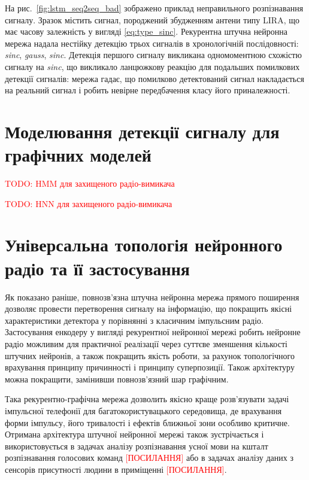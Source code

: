 На рис.~\ref{fig:lstm_seq2seq_bad} зображено приклад неправильного
розпізнавання сигналу. Зразок містить сигнал, породжений збудженням антени 
типу LIRA, що має часову залежність у вигляді \eqref{eq:type_sinc}. 
Рекурентна штучна нейронна мережа надала нестійку
детекцію трьох сигналів в хронологічній послідовності: \textit{sinc}, 
\textit{gauss}, \textit{sinc}. Детекція першого сигналу викликана 
одномоментною схожістю сигналу на \textit{sinc}, що викликало ланцюжкову 
реакцію для подальших помилкових детекції сигналів: мережа гадає, що 
помилково детектований сигнал накладається на реальний сигнал і робить 
невірне передбачення класу його приналежності.

\section{Моделювання детекції сигналу для графічних моделей}

\textcolor{red}{TODO: HMM для захищеного радіо-вимикача}

\textcolor{red}{TODO: HNN для захищеного радіо-вимикача}

\section{Універсальна топологія нейронного радіо та її застосування}

Як показано раніше, повнозв'язна штучна нейронна мережа прямого поширення
дозволяє провести перетворення сигналу на інформацію, що покращить якісні 
характеристики детектора у порівнянні з класичним імпульсним радіо. 
Застосування енкодеру у вигляді рекурентної нейронної мережі робить нейронне 
радіо можливим для практичної реалізації через суттєве зменшення кількості 
штучних нейронів, а також покращить якість роботи, за рахунок топологічного 
врахування принципу причинності і принципу суперпозиції. Також архітектуру 
можна покращити, замінивши повнозв'язний шар графічним.

Така рекурентно-графічна мережа дозволить якісно краще розв'язувати задачі 
імпульсної телефонії для багатокористувацького середовища, де врахування форми 
імпульсу, його тривалості і ефектів ближньої зони особливо критичне. Отримана 
архітектура штучної нейронної мережі також зустрічається і використовується в 
задачах аналізу розпізнавання усної мови на кшталт розпізнавання голосових 
команд \textcolor{red}{[ПОСИЛАННЯ]} або в задачах аналізу даних з сенсорів
присутності людини в приміщенні \textcolor{red}{[ПОСИЛАННЯ]}. 

